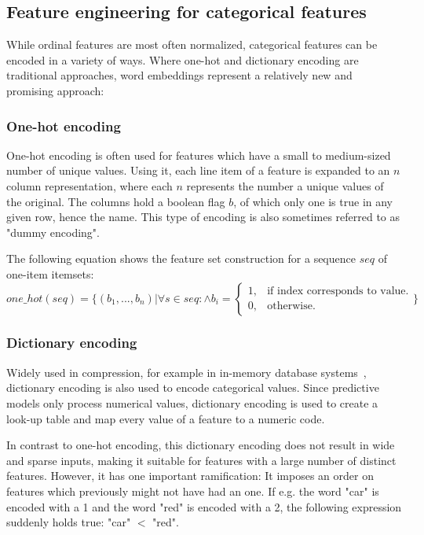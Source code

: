\subsection{Feature engineering for categorical features}
While ordinal features are most often normalized, categorical features can be encoded in a variety of ways. Where one-hot and dictionary encoding are traditional approaches, word embeddings represent a relatively new and promising approach:

\subsubsection*{One-hot encoding}
One-hot encoding is often used for features which have a small to medium-sized number of unique values. Using it, each line item of a feature is expanded to an $n$ column representation, where each $n$ represents the number a unique values of the original. The columns hold a boolean flag $b$, of which only one is true in any given row, hence the name. This type of encoding is also sometimes referred to as "dummy encoding".

The following equation shows the feature set construction for a sequence $seq$ of one-item itemsets:
\begin{equation}\label{eq:one-hot}
    one\_hot(seq) = \{(b_1, ..., b_n) | \forall s \in seq: \wedge b_i = 
    \begin{cases}
    1, & \text{if index corresponds to value}.\\
    0, & \text{otherwise}.
    \end{cases}
    \}
\end{equation}

\subsubsection*{Dictionary encoding}
Widely used in compression, for example in in-memory database systems~\cite{plattner2012memory}, dictionary encoding is also used to encode categorical values. Since predictive models only process numerical values, dictionary encoding is used to create a look-up table and map every value of a feature to a numeric code.

In contrast to one-hot encoding, this dictionary encoding does not result in wide and sparse inputs, making it suitable for features with a large number of distinct features. However, it has one important ramification: It imposes an order on features which previously might not have had an one. If e.g. the word "car" is encoded with a 1 and the word "red" is encoded with a 2, the following expression suddenly holds true: "car" $<$ "red".

